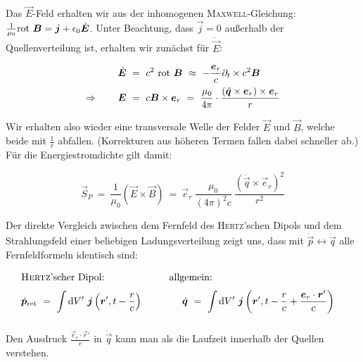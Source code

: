 Das $\vec{E}$-Feld erhalten wir aus der inhomogenen \textsc{Maxwell}-Gleichung: $\frac{1}{\mu_0}\text{rot }\bm{B}= \bm{j} + \epsilon_0\dot{\bm{E}}$. Unter Beachtung, dass $\vec{j}=0$ außerhalb der Quellenverteilung ist, erhalten wir zunächst für $\dot{\vec{E}}$:

\begin{align*}
\dot{\vec{E}}  \ &= \ c^2 \ \rot\vec{B} \ \approx \ - \frac{\vec{e}_r}{c}\partial_t\times c^2 \vec{B}\\
\Rightarrow\qquad \vec{E} \ &= \ c\vec{B}\times\vec{e}_r  \ = \ \frac{\mu_0}{4\pi} \cdot \frac{\left(\ddot{\vec{q}}\times\vec{e}_r\right)\times\vec{e}_r}{r}
\end{align*}

Wir erhalten also wieder eine transversale Welle der Felder $\vec{E}$ und $\vec{B}$, welche beide mit $\frac{1}{r}$ abfallen. (Korrekturen aus höheren Termen fallen dabei schneller ab.)\\
Für die Energiestromdichte gilt damit:

\begin{equation*}
\vec{S}_P \ = \ \frac{1}{\mu_0} (\vec{E}\times\vec{B})  \ = \  \vec{e}_r \ \frac{\mu_0}{(4\pi)^2 c} \ \frac{\left(\ddot{\vec{q}}\times\vec{e}_r\right)^2}{r^2}
\end{equation*}

Der direkte Vergleich zwischen dem Fernfeld des \textsc{Hertz}'schen Dipols und dem Strahlungsfeld einer beliebigen Ladungsverteilung zeigt uns, dass mit $\dot{\vec{p}}\leftrightarrow\dot{\vec{q}}$ alle Fernfeldformeln identisch sind:

\begin{align*}
&\text{\textsc{Hertz}'scher Dipol:} \qquad\qquad\qquad\ \; \text{allgemein:}&\\
&\dot{\vec{p}}_{\text{ret}}  \ = \ \Int{}{}{V'} \vec{j}\left(\vec{r}',t-\frac{r}{c}\right) \qquad \qquad \dot{\vec{q}}  \ = \ \Int{}{}{V'}\vec{j}\left(\vec{r}',t-\frac{r}{c}+\frac{\vec{e}_r\cdot\vec{r}'}{c}\right)
\end{align*}

Den Ausdruck $\frac{\vec{e}_r\cdot\vec{r}'}{c}$ in $\dot{\vec{q}}$ kann man als die Laufzeit innerhalb der Quellen verstehen.
